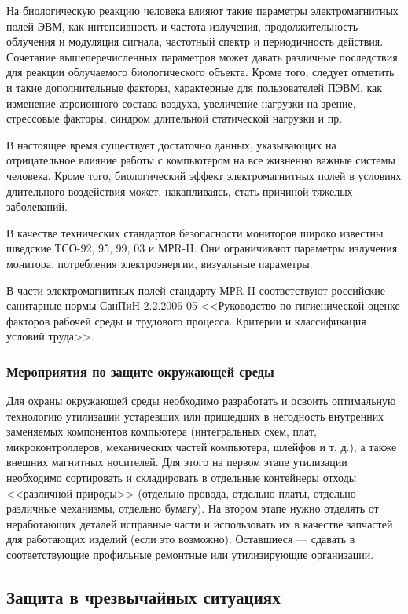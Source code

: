 На биологическую реакцию человека влияют такие параметры электромагнитных полей ЭВМ, как интенсивность и частота излучения, продолжительность облучения и модуляция сигнала, частотный спектр и периодичность действия.
Сочетание вышеперечисленных параметров может давать различные последствия для реакции облучаемого биологического объекта.
Кроме того, следует отметить и такие дополнительные факторы, характерные для пользователей ПЭВМ, как изменение аэроионного состава воздуха, увеличение нагрузки на зрение, стрессовые факторы, синдром длительной статической нагрузки и пр.

В настоящее время существует достаточно данных, указывающих на отрицательное влияние работы с компьютером на все жизненно важные системы человека.
Кроме того, биологический эффект электромагнитных полей в условиях длительного воздействия может, накапливаясь, стать причиной тяжелых заболеваний.

В качестве технических стандартов безопасности мониторов широко известны шведские ТСО-92, 95, 99, 03 и МРR-II.
Они ограничивают параметры излучения монитора, потребления электроэнергии, визуальные параметры.

В части электромагнитных полей стандарту МРR-II соответствуют российские санитарные нормы СанПиН 2.2.2006-05 <<Руководство по гигиенической оценке факторов рабочей среды и трудового процесса. Критерии и классификация условий труда>>.

\subsubsection{Мероприятия по защите окружающей среды}
Для охраны окружающей среды необходимо разработать и освоить оптимальную технологию утилизации устаревших или пришедших в негодность внутренних заменяемых компонентов компьютера (интегральных схем, плат, микроконтроллеров, механических частей компьютера, шлейфов и т. д.), а также внешних магнитных носителей.
Для этого на первом этапе утилизации необходимо сортировать и складировать в отдельные контейнеры отходы <<различной природы>> (отдельно провода, отдельно платы, отдельно различные механизмы, отдельно бумагу).
На втором этапе нужно отделять от неработающих деталей исправные части и использовать их в качестве запчастей для работающих изделий (если это возможно).
Оставшиеся --- сдавать в соответствующие профильные ремонтные или утилизирующие организации.


\subsection{Защита в чрезвычайных ситуациях}

